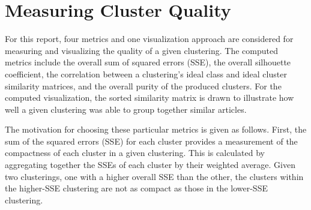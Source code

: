 \documentclass[11pt]{article}
\begin{document}


\section{Measuring Cluster Quality} \label{sec:quality}

For this report, four metrics and one visualization approach are considered for measuring and visualizing the quality of a given clustering.
The computed metrics include the overall sum of squared errors (SSE), the overall silhouette coefficient, the correlation between a clustering's ideal class and ideal cluster similarity matrices, and the overall purity of the produced clusters.
For the computed visualization, the sorted similarity matrix is drawn to illustrate how well a given clustering was able to group together similar articles.

The motivation for choosing these particular metrics is given as follows.
First, the sum of the squared errors (SSE) for each cluster provides a measurement of the compactness of each cluster in a given clustering.
This is calculated by aggregating together the SSEs of each cluster by their weighted average.
Given two clusterings, one with a higher overall SSE than the other, the clusters within the higher-SSE clustering are not as compact as those in the lower-SSE clustering.
\end{document}
